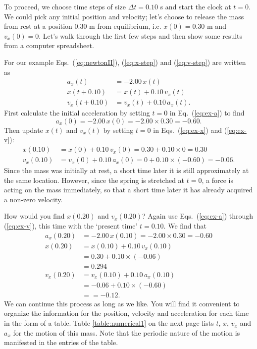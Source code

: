 To proceed, we choose time steps of size $\Delta t = 0.10$ s and start
the clock at $t = 0$.  We could pick any initial position and
velocity; let's choose to release the mass from rest at a position
0.30 m from equilibrium, i.e. $x(0) = 0.30$ m and $v_x(0) = 0$.  Let's
walk through the first few steps and then show some results from a
computer spreadsheet.
   
For our example Eqs.~(\ref{eq:newtonII}), (\ref{eq:x-step}) and
(\ref{eq:v-step}) are written as
\begin{align}
a_x(t) &= -2.00\, x(t) 
\label{eq:ex-a}\\
x(t+0.10) &= x(t) + 0.10\, v_x(t) 
\label{eq:ex-x}\\
v_x(t+0.10) &= v_x(t) + 0.10\, a_x(t).
\label{eq:ex-v}
\end{align}
First calculate the initial acceleration by setting $t = 0$ in
Eq.~(\ref{eq:ex-a}) to find
\begin{equation}
a_x(0) = -2.00\, x(0)  = -2.00 \times 0.30 = -0.60.
\end{equation}
Then update $x(t)$ and $v_x(t)$ by setting $t = 0$ in Eqs.~(\ref{eq:ex-x}) and 
(\ref{eq:ex-v}):
\begin{align}
x(0.10) &= x(0) + 0.10\, v_x(0) = 0.30 + 0.10\times 0 = 0.30 \\
v_x(0.10) &= v_x(0) + 0.10\, a_x(0) = 0 + 0.10\times(-0.60) = -0.06.
\end{align}
Since the mass was initially at rest, a short time later it is still
approximately at the same location.  However, since the spring is
stretched at $t = 0$, a force is acting on the mass immediately, so
that a short time later it has already acquired a non-zero velocity.
   
How would you find $x(0.20)$ and $v_x(0.20)$?  Again use
Eqs.~(\ref{eq:ex-a}) through (\ref{eq:ex-v}), this time with the
`present time' $t = 0.10$.  We find that
\begin{align}
a_x(0.20) &= -2.00\, x(0.10) = -2.00\times 0.30 = -0.60\\
x(0.20) &= x(0.10) + 0.10\, v_x(0.10) \nonumber \\
        &= 0.30 + 0.10 \times (-0.06) \nonumber \\
        &= 0.294 \\
v_x(0.20) &= v_x(0.10) + 0.10\, a_x(0.10) \nonumber  \\
        &= -0.06 + 0.10\times(-0.60) \nonumber \\
        &= = -0.12.
\end{align}
We can continue this process as long as we like.  You will find it
convenient to organize the information for the position, velocity and
acceleration for each time in the form of a table.  Table
\ref{table:numerical1} on the next page lists $t$, $x$, $v_x$ and $a_x$ for
the motion of this mass.  Note that the periodic nature of the motion
is manifested in the entries of the table.  

